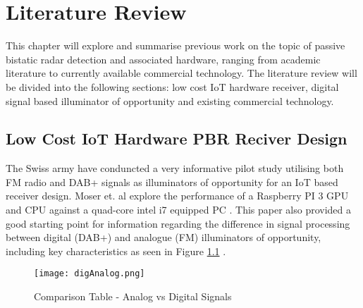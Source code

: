\chapter{Literature Review \label{sec:litReview}}


This chapter will explore and summarise previous work on the topic of passive bistatic radar detection and associated hardware, ranging from academic literature to currently available commercial technology. The literature review will be divided into the following sections: low cost IoT hardware receiver, digital signal based illuminator of opportunity and existing commercial technology.

\section{Low Cost IoT Hardware PBR Reciver Design}

The Swiss army have conduncted a very informative pilot study utilising both FM radio and DAB+ signals as illuminators of opportunity for an IoT based receiver design. Moser et. al explore the performance of a Raspberry PI 3 GPU and CPU against a quad-core intel i7 equipped PC \cite{IOTpassiveRadar} . This paper also provided a good starting point for information regarding the difference in signal processing between digital (DAB+) and analogue (FM) illuminators of opportunity, including key characteristics as seen in Figure \ref{fig:signals} . 

\begin{figure}[htbp]
    \centering
    \texttt{[image: digAnalog.png]}
    \caption{Comparison Table - Analog vs Digital Signals \cite{IOTpassiveRadar}}
    \label{fig:signals}
\end{figure}

